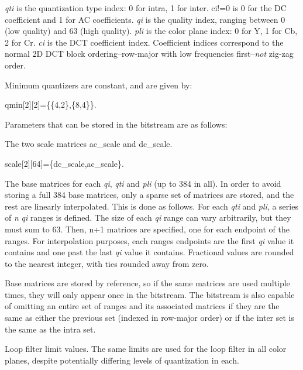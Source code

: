 {\itshape qti} is the quantization type index\+: 0 for intra, 1 for inter. {\ttfamily ci!=0} is 0 for the D\+C coefficient and 1 for A\+C coefficients. {\itshape qi} is the quality index, ranging between 0 (low quality) and 63 (high quality). {\itshape pli} is the color plane index\+: 0 for Y\textquotesingle{}, 1 for Cb, 2 for Cr. {\itshape ci} is the D\+C\+T coefficient index. Coefficient indices correspond to the normal 2\+D D\+C\+T block ordering--row-\/major with low frequencies first--{\itshape not} zig-\/zag order.

Minimum quantizers are constant, and are given by\+: 
\begin{DoxyCode}
qmin[2][2]=\{\{4,2\},\{8,4\}\}.
\end{DoxyCode}


Parameters that can be stored in the bitstream are as follows\+:
\begin{DoxyItemize}
\item The two scale matrices ac\+\_\+scale and dc\+\_\+scale. 
\begin{DoxyCode}
scale[2][64]=\{dc_scale,ac_scale\}.
\end{DoxyCode}

\item The base matrices for each {\itshape qi}, {\itshape qti} and {\itshape pli} (up to 384 in all). In order to avoid storing a full 384 base matrices, only a sparse set of matrices are stored, and the rest are linearly interpolated. This is done as follows. For each {\itshape qti} and {\itshape pli}, a series of {\itshape n} {\itshape qi} ranges is defined. The size of each {\itshape qi} range can vary arbitrarily, but they must sum to 63. Then, {\ttfamily n+1} matrices are specified, one for each endpoint of the ranges. For interpolation purposes, each range\textquotesingle{}s endpoints are the first {\itshape qi} value it contains and one past the last {\itshape qi} value it contains. Fractional values are rounded to the nearest integer, with ties rounded away from zero.

Base matrices are stored by reference, so if the same matrices are used multiple times, they will only appear once in the bitstream. The bitstream is also capable of omitting an entire set of ranges and its associated matrices if they are the same as either the previous set (indexed in row-\/major order) or if the inter set is the same as the intra set.
\item Loop filter limit values. The same limits are used for the loop filter in all color planes, despite potentially differing levels of quantization in each.
\end{DoxyItemize}

